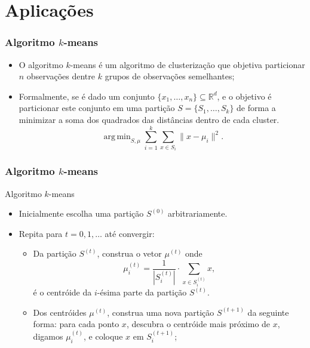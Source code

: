 \documentclass{beamer}
\newcommand{\R}{\mathbb{R}}
\DeclareMathOperator*{\argmin}{arg\,min}
\begin{document}
\section{Aplicações}
\begin{frame}
	
	\frametitle{Algoritmo $k$-means}
	\pause
	\begin{itemize}
		\item O algoritmo $k$-means é um algoritmo de clusterização que
		objetiva particionar $n$ observações dentre $k$ grupos de observações
		semelhantes; \pause
		\item Formalmente, se é dado um conjunto $\{x_1,\ldots, x_n\}\subseteq
		\R^d$, e o objetivo é particionar este conjunto em uma partição
		$S=\{S_1,\ldots, S_k\}$ de forma a minimizar a soma dos quadrados
		das distâncias dentro de cada cluster. \pause
		\[
		\argmin_{S,\mu} \sum_{i=1}^k \sum_{x\in S_i} \|x-\mu_i\|^2.
		\]
	\end{itemize}

\end{frame}

\begin{frame}
	
	\frametitle{Algoritmo $k$-means}
	\begin{block}{Algoritmo $k$-means}
	\begin{itemize}
		\item Inicialmente escolha uma partição $S^{(0)}$ arbitrariamente.
		\pause
		\item Repita para $t=0,1,\ldots$ até convergir:
		\pause
		\begin{itemize}
			\item Da partição $S^{(t)}$, construa o vetor $\mu^{(t)}$ onde
			\[
			\mu^{(t)}_i = \frac{1}{|S^{(t)}_i|} \cdot
			\sum_{x\in S^{(t)}_i} x,
			\]
			é o centróide da $i$-ésima parte da partição $S^{(t)}$.\pause
			\item Dos centróides $\mu^{(t)}$, construa uma nova partição
			$S^{(t+1)}$ da seguinte forma: \pause para cada ponto $x$,
			descubra o centróide mais próximo de $x$, digamos $\mu^{(t)}_i$,
			e coloque $x$ em $S^{(t+1)}_i$;
		\end{itemize}
	\end{itemize}
	\end{block}

\end{frame}
\end{document}
